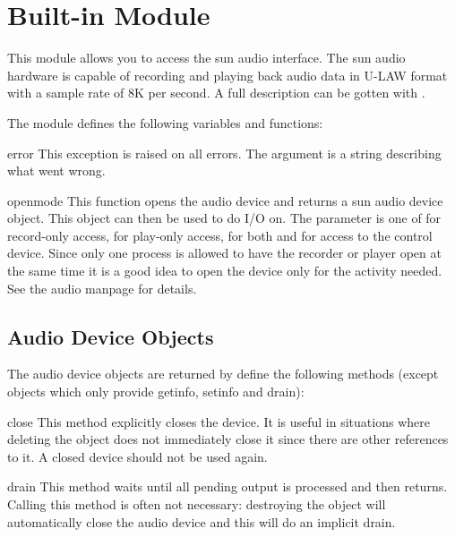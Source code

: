 \section{Built-in Module }
\label{module-sunaudiodev}

This module allows you to access the sun audio interface. The sun
audio hardware is capable of recording and playing back audio data
in U-LAW format with a sample rate of 8K per second. A full
description can be gotten with .

The module defines the following variables and functions:

\begin{excdesc}{error}
This exception is raised on all errors. The argument is a string
describing what went wrong.
\end{excdesc}

\begin{funcdesc}{open}{mode}
This function opens the audio device and returns a sun audio device
object. This object can then be used to do I/O on. The  parameter
is one of  for record-only access,  for play-only
access,  for both and  for access to the
control device. Since only one process is allowed to have the recorder
or player open at the same time it is a good idea to open the device
only for the activity needed. See the audio manpage for details.
\end{funcdesc}

\subsection{Audio Device Objects}

The audio device objects are returned by  define the
following methods (except  objects which only provide
getinfo, setinfo and drain):


\begin{funcdesc}{close}{}
This method explicitly closes the device. It is useful in situations
where deleting the object does not immediately close it since there
are other references to it. A closed device should not be used again.
\end{funcdesc}

\begin{funcdesc}{drain}{}
This method waits until all pending output is processed and then returns.
Calling this method is often not necessary: destroying the object will
automatically close the audio device and this will do an implicit drain.
\end{funcdesc}

